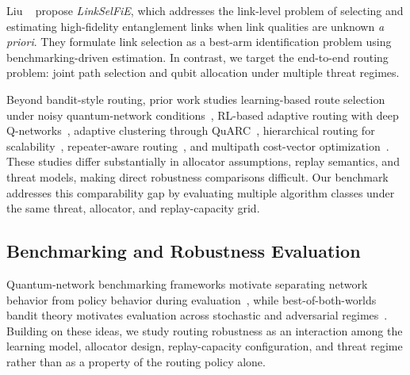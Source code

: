 Liu \etal~\cite{10621263} propose \emph{LinkSelFiE}, which addresses the link-level problem of selecting and estimating high-fidelity entanglement links when link qualities are unknown \emph{a priori}. They formulate link selection as a best-arm identification problem using benchmarking-driven estimation. In contrast, we target the end-to-end routing problem: joint path selection and qubit allocation under multiple threat regimes.

Beyond bandit-style routing, prior work studies learning-based route selection under noisy quantum-network conditions~\cite{chaudhary2023quantum}, RL-based adaptive routing with deep Q-networks~\cite{jallowkhan2025adaptive}, adaptive clustering through QuARC~\cite{clayton2024quarc}, hierarchical routing for scalability~\cite{cicconetti2024scalable}, repeater-aware routing~\cite{kumar2024routing}, and multipath cost-vector optimization~\cite{leone2021costvector}. These studies differ substantially in allocator assumptions, replay semantics, and threat models, making direct robustness comparisons difficult. Our benchmark addresses this comparability gap by evaluating multiple algorithm classes under the same threat, allocator, and replay-capacity grid.

\subsection{Benchmarking and Robustness Evaluation}

Quantum-network benchmarking frameworks motivate separating network behavior from policy behavior during evaluation~\cite{coopmans2021benchmark,kozlowski2022utility}, while best-of-both-worlds bandit theory motivates evaluation across stochastic and adversarial regimes~\cite{zimmert2019optimal}. Building on these ideas, we study routing robustness as an interaction among the learning model, allocator design, replay-capacity configuration, and threat regime rather than as a property of the routing policy alone.